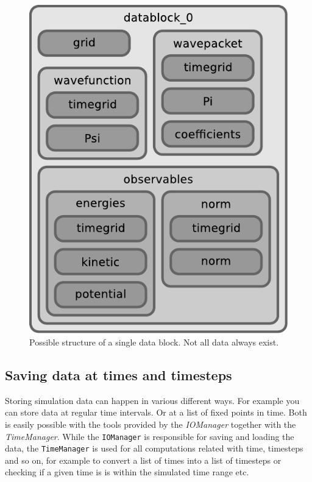 \documentclass[a4paper,10pt]{report}
\begin{document}
\begin{figure}
  \centering
  \includegraphics[scale=0.75]{./fig/structure_datablock.pdf}
  \caption{Possible structure of a single data block. Not all data always exist.}
  \label{fig:blockschema}
\end{figure}

\subsection{Saving data at times and timesteps}

Storing simulation data can happen in various different ways. For example you
can store data at regular time intervals. Or at a list of fixed points in time.
Both is easily possible with the tools provided by the \emph{IOManager} together
with the \emph{TimeManager}. While the \texttt{IOManager} is responsible for
saving and loading the data, the \texttt{TimeManager} is used for all computations
related with time, timesteps and so on, for example to convert a list of times
into a list of timesteps or checking if a given time is is within the simulated
time range etc.
\end{document}
